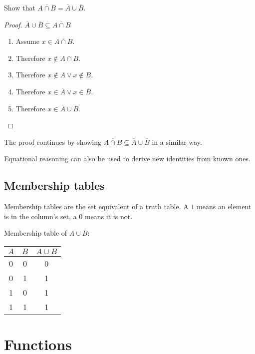 \begin{example}
    Show that \(\overline{A \cap B} = \overline{A} \cup \overline{B}\).
    \begin{proof}
        \(\overline{A} \cup \overline{B} \subseteq \overline{A \cap B}\)
        \begin{enumerate}
            \item Assume \(x \in \overline{A \cap B}\).
            \item Therefore \(x \notin A \cap B\).
            \item Therefore \(x \notin A \lor x \notin B\).
            \item Therefore \(x \in \overline{A} \lor x \in \overline{B}\).
            \item Therefore \(x \in \overline{A} \cup \overline{B}\).
        \end{enumerate}
    \end{proof}
    The proof continues by showing \(\overline{A \cap B} \subseteq \overline{A} \cup \overline{B}\) in a similar way.
\end{example}

Equational reasoning can also be used to derive new identities from known ones.

\subsection{Membership tables}
Membership tables are the set equivalent of a truth table. A \(1\) means an element is in the column's set, a \(0\) means it is not.

\begin{example}
    Membership table of \(A \cup B\):

    \begin{tabular}{ccc}
        \toprule
        \(A\) & \(B\) & \(A \cup B\) \\
        \midrule
        0     & 0     & 0            \\
        0     & 1     & 1            \\
        1     & 0     & 1            \\
        1     & 1     & 1            \\
        \bottomrule
    \end{tabular}
\end{example}

\section{Functions}
